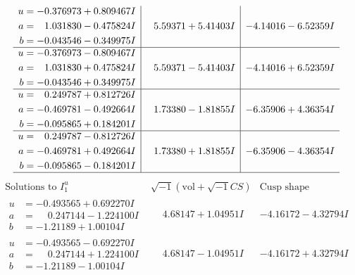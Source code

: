 \documentclass[1p]{elsarticle_modified}
\theoremstyle{definition}
\newcommand{\I}{\sqrt{-1}}
\begin{document}
$$\begin{array}{c|c|c}
\begin{aligned}
u &= -0.376973 + 0.809467 I \\
a &= \phantom{-}1.031830 - 0.475824 I \\
b &= -0.043546 - 0.349975 I\end{aligned}
 & \phantom{-}5.59371 + 5.41403 I & -4.14016 - 6.52359 I \\ \hline\begin{aligned}
u &= -0.376973 - 0.809467 I \\
a &= \phantom{-}1.031830 + 0.475824 I \\
b &= -0.043546 + 0.349975 I\end{aligned}
 & \phantom{-}5.59371 - 5.41403 I & -4.14016 + 6.52359 I \\ \hline\begin{aligned}
u &= \phantom{-}0.249787 + 0.812726 I \\
a &= -0.469781 - 0.492664 I \\
b &= -0.095865 + 0.184201 I\end{aligned}
 & \phantom{-}1.73380 - 1.81855 I & -6.35906 + 4.36354 I \\ \hline\begin{aligned}
u &= \phantom{-}0.249787 - 0.812726 I \\
a &= -0.469781 + 0.492664 I \\
b &= -0.095865 - 0.184201 I\end{aligned}
 & \phantom{-}1.73380 + 1.81855 I & -6.35906 - 4.36354 I\\
 \hline 
 \end{array}$$\newpage$$\begin{array}{c|c|c}  
\text{Solutions to }I^u_{1}& \I (\text{vol} + \sqrt{-1}CS) & \text{Cusp shape}\\
 \hline 
\begin{aligned}
u &= -0.493565 + 0.692270 I \\
a &= \phantom{-}0.247144 - 1.224100 I \\
b &= -1.21189 + 1.00104 I\end{aligned}
 & \phantom{-}4.68147 + 1.04951 I & -4.16172 - 4.32794 I \\ \hline\begin{aligned}
u &= -0.493565 - 0.692270 I \\
a &= \phantom{-}0.247144 + 1.224100 I \\
b &= -1.21189 - 1.00104 I\end{aligned}
 & \phantom{-}4.68147 - 1.04951 I & -4.16172 + 4.32794 I \\ \hline\begin{aligned}

\end{aligned}
\end{array}$$
\end{document}

